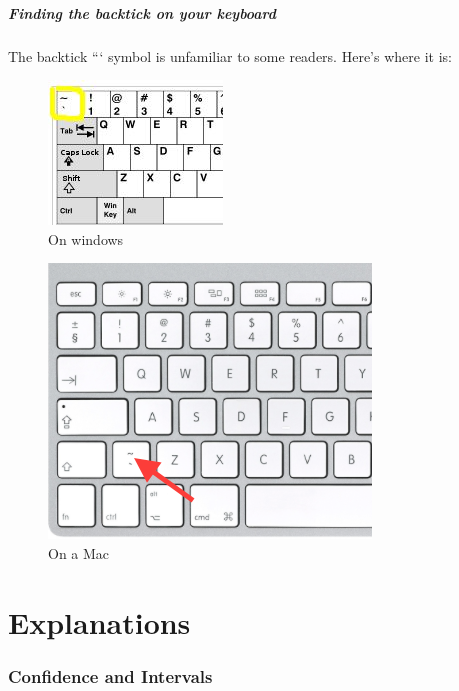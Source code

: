 \documentclass[]{article}
\begin{document}
\hypertarget{backtick-location}{%
\subsubsection*{Finding the backtick on your keyboard}\label{backtick-location}}

The backtick ``` symbol is unfamiliar to some readers. Here's where it is:

\begin{figure}
\centering
\includegraphics{media/backtick-windows-uk.png}
\caption{On windows}
\end{figure}

\begin{figure}
\centering
\includegraphics{media/backtick-mac-uk.png}
\caption{On a Mac}
\end{figure}

\hypertarget{part-explanations}{%
\part{Explanations}\label{part-explanations}}

\hypertarget{intervals}{%
\section{Confidence and Intervals}\label{intervals}}
\end{document}
